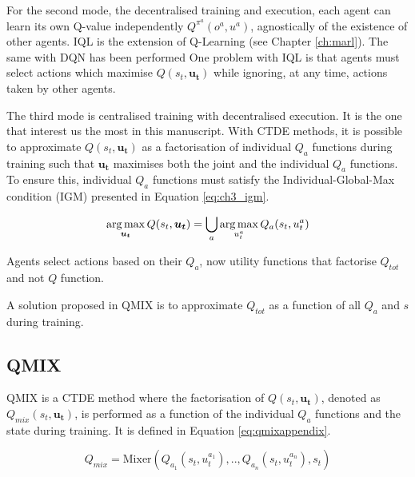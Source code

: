 For the second mode, the decentralised training and execution, each agent can learn its own Q-value independently $Q^{\pi^a}(o^a, u^a)$, agnostically of the existence of other agents.
IQL \citep{Tan1993} is the extension of Q-Learning (see Chapter \ref{ch:marl}).
The same with DQN has been performed \citep{TampuuDqnIQL}
One problem with IQL is that agents must select actions which maximise $Q(s_t, \mathbf{u_t})$ while ignoring, at any time, actions taken by other agents.

The third mode is centralised training with decentralised execution.
It is the one that interest us the most in this manuscript.
With CTDE methods, it is possible to approximate $Q(s_t, \mathbf{u_t})$ as a factorisation of individual $Q_a$ functions during training such that $\mathbf{u_t}$ maximises both the joint and the individual $Q_a$ functions.
To ensure this, individual $Q_a$ functions must satisfy the Individual-Global-Max condition (IGM)\citep{Son2019QTRAN:Learning} presented in Equation \ref{eq:ch3_igm}.

\begin{equation}
    \argmax_{\mathbf{u_t}} Q(s_t, \mathbf{u_t}) =\bigcup_{a}\argmax_{u_t^{a}} Q_{a}(s_t, u_t^{a})
    \label{eq:ch3_igm}
\end{equation}

Agents select actions based on their $Q_a$, now utility functions that factorise $Q_{tot}$ and not $Q$ function.

A solution proposed in QMIX \citep{Rashid2018} is to approximate $Q_{tot}$ as a function of all $Q_a$ and $s$ during training.


\subsection{QMIX} 
QMIX \citep{Rashid2018} is a CTDE method where the factorisation of $Q(s_t, \mathbf{u_t})$, denoted as $Q_{mix}(s_t, \mathbf{u_t})$, is performed as a function of the individual $Q_a$ functions and the state during training. It is defined in Equation \ref{eq:qmixappendix}.

\begin{equation}
     Q_{mix}=\text{Mixer} \left(Q_{a_1}(s_t, u_t^{a_1}) ,..,Q_{a_n}(s_t, u_t^{a_n}), s_t\right)
     \label{eq:qmixappendix}
\end{equation}


